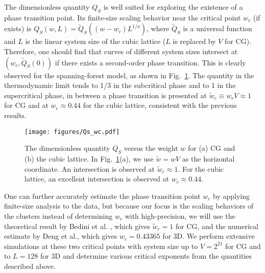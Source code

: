 The dimensionless quantity $Q_{S}$ is well suited for exploring the existence of a phase transition point.
Its finite-size scaling behavior near the critical point $w_c$ (if exists) is $Q_{S}(w, L) = \tilde{Q}_{S}((w-w_c)L^{1/\nu})$,
where $\tilde{Q}_{S}$ is a universal function and $L$ is the linear system size of the cubic lattice ($L$ is replaced by $V$ for CG). Therefore, one should find that curves of different system sizes intersect
at $\left(w_c, \tilde{Q}_{S}(0)\right)$ if there exists a second-order phase transition. This is clearly observed for the spanning-forest model,
as shown in Fig.~\ref{fig:wc}. The quantity in the thermodynamic limit tends to 1/3 in the subcritical phase and to 1 in the supercritical phase,
in between a phase transition is presented at $\tilde{w}_c \equiv w_c V \approx 1$ for CG and at $w_c \approx 0.44$ for the cubic lattice,
consistent with the previous results\cite{Luczak1992,Deng2007,Bedini2009,Roland2021Percolation}.

\begin{figure}[t]
	\centering
	\texttt{[image: figures/Qs\_wc.pdf]}
	\caption{The dimensionless quantity $Q_S$ versus the weight $w$ for (a) CG and (b) the cubic lattice. 
	In Fig.~\ref{fig:wc}(a), we use $\tilde{w} = wV$ as the horizontal coordinate. An intersection is observed at $\tilde{w}_c \approx 1$. 
	For the cubic lattice, an excellent intersection is observed at $w_c \approx 0.44$. }
	\label{fig:wc}
\end{figure}

One can further accurately estimate the phase transition point $w_c$ by applying finite-size analysis to the data, but because our focus is the 
scaling behaviors of the clusters instead of determining $w_c$ with high-precision, we will use 
the theoretical result by Bedini et al. \cite{Bedini2009}, which gives $\tilde{w}_c = 1$ for CG, and
the numerical estimate by Deng et al.\cite{Deng2007}, which gives $w_c = 0.43365$ for 3D. We perform extensive simulations at these
two critical points with system size up to $V = 2^{21}$ for CG and to $L=128$ for 3D and determine various critical exponents from the quantities described above. 

